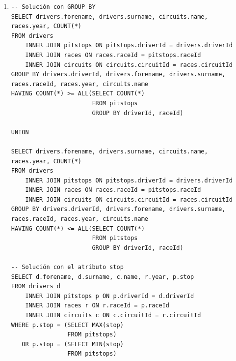 \documentclass[a4paper]{article}
\begin{document}
\begin{enumerate}
    \item %
    \begin{verbatim}   
-- Solución con GROUP BY
SELECT drivers.forename, drivers.surname, circuits.name, races.year, COUNT(*)
FROM drivers
	INNER JOIN pitstops ON pitstops.driverId = drivers.driverId
    INNER JOIN races ON races.raceId = pitstops.raceId
    INNER JOIN circuits ON circuits.circuitId = races.circuitId
GROUP BY drivers.driverId, drivers.forename, drivers.surname, races.raceId, races.year, circuits.name
HAVING COUNT(*) >= ALL(SELECT COUNT(*)
					   FROM pitstops
					   GROUP BY driverId, raceId)

UNION

SELECT drivers.forename, drivers.surname, circuits.name, races.year, COUNT(*)
FROM drivers
	INNER JOIN pitstops ON pitstops.driverId = drivers.driverId
    INNER JOIN races ON races.raceId = pitstops.raceId
    INNER JOIN circuits ON circuits.circuitId = races.circuitId
GROUP BY drivers.driverId, drivers.forename, drivers.surname, races.raceId, races.year, circuits.name
HAVING COUNT(*) <= ALL(SELECT COUNT(*)
					   FROM pitstops
					   GROUP BY driverId, raceId)

-- Solución con el atributo stop
SELECT d.forename, d.surname, c.name, r.year, p.stop
FROM drivers d
	INNER JOIN pitstops p ON p.driverId = d.driverId
    INNER JOIN races r ON r.raceId = p.raceId
    INNER JOIN circuits c ON c.circuitId = r.circuitId
WHERE p.stop = (SELECT MAX(stop)
				FROM pitstops)
   OR p.stop = (SELECT MIN(stop)
				FROM pitstops)
    \end{verbatim}            
    

\end{enumerate}
\end{document}
